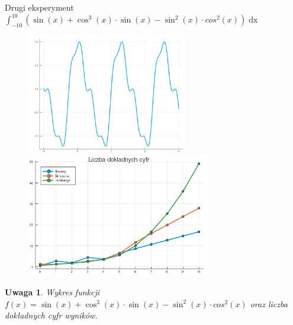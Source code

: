 \documentclass[11pt,wide]{article}
\newtheorem{remark}{Uwaga}
\begin{document}
Drugi eksperyment \(\displaystyle \int_{-10}^{10} (\sin(x) + \cos^3(x) \cdot \sin(x) - \sin^2(x) \cdot cos^2(x))\mathop{dx} \)
\begin{figure}[h!]
	\includegraphics[width=70mm,scale=0.5]{tryg2}
	\includegraphics[width=80mm,scale=0.5]{tryg_blad2}
\end{figure}
\begin{remark}
\centering
Wykres funkcji \(\displaystyle f(x) = \sin(x) + \cos^3(x) \cdot \sin(x) - \sin^2(x) \cdot cos^2(x)\) oraz liczba dokładnych cyfr wyników. 
\end{remark}
\pagebreak
\end{document}
